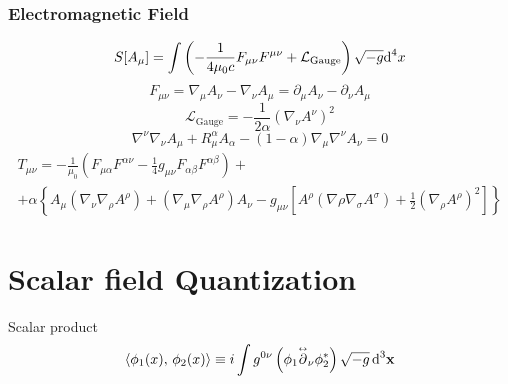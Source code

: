 \subsubsection{Electromagnetic Field}
\begin{equation}
	S[A_\mu]=\int\left(-\frac{1}{4\mu_0 c}F_{\mu\nu}F^{\mu\nu}+\mathcal{L}_{\text{Gauge}}\right)\sqrt{-g}\text{d}^4x
\end{equation}
\begin{equation}
	F_{\mu\nu}=\nabla_\mu A_\nu-\nabla_\nu A_\mu=\partial_\mu A_\nu-\partial_\nu A_\mu
\end{equation}
\begin{equation}
	\mathcal{L}_{\text{Gauge}}=-\frac{1}{2\alpha}\left(\nabla_\nu A^\nu\right)^2
\end{equation}
\begin{equation}
	\nabla^\nu\nabla_\nu A_\mu+R_\mu^\alpha A_\alpha-\left(1-\alpha\right)\nabla_\mu\nabla^\nu A_\nu=0
\end{equation}
\begin{multline}
	T_{\mu\nu}=-\frac{1}{\mu_0}\left(F_{\mu\alpha}F^{\alpha\nu}-\frac{1}{4}g_{\mu\nu}F_{\alpha\beta}F^{\alpha\beta}\right)+\\
	+\alpha\left\{A_\mu\left(\nabla_\nu\nabla_\rho A^\rho\right)+\left(\nabla_\mu\nabla_\rho A^\rho\right)A_\nu-g_{\mu\nu}\left[A^\rho\left(\nabla\rho\nabla_\sigma A^\sigma\right)+\frac{1}{2}\left(\nabla_\rho A^\rho\right)^2\right]\right\}
\end{multline}
\section{Scalar field Quantization}


Scalar product
\begin{equation}
	\langle \phi_1(x),\,\phi_2(x)\rangle\equiv i\int g^{0\nu}\left(\phi_1\overset{\text{\tiny$\leftrightarrow$}}{\partial}_\nu\phi_2^*\right)\sqrt{-g}\,\text{d}^3\mathbf{x}
\end{equation}

